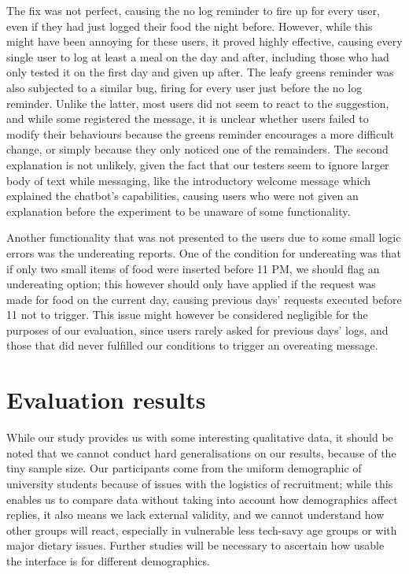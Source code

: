 The fix was not perfect, causing the no log reminder to fire up for every user, even if they had just logged their food the night before. However, while this might have been annoying for these users, it proved highly effective, causing every single user to log at least a meal on the day and after, including those who had only tested it on the first day and given up after. The leafy greens reminder was also subjected to a similar bug, firing for every user just before the no log reminder. Unlike the latter, most users did not seem to react to the suggestion, and while some registered the message, it is unclear whether users failed to modify their behaviours because the greens reminder encourages a more difficult change, or simply because they only noticed one of the remainders. The second explanation is not unlikely, given the fact that our testers seem to ignore larger body of text while messaging, like the introductory welcome message which explained the chatbot's capabilities, causing users who were not given an explanation before the experiment to be unaware of some functionality. 

Another functionality that was not presented to the users due to some small logic errors was the undereating reports. One of the condition for undereating was that if only two small items of food were inserted before 11 PM, we should flag an undereating option; this however should only have applied if the request was made for food on the current day, causing previous days' requests executed before 11 not to trigger. This issue might however be considered negligible for the purposes of our evaluation, since users rarely asked for previous days' logs, and those that did never fulfilled our conditions to trigger an overeating message.
\section{Evaluation results}
While our study provides us with some interesting qualitative data, it should be noted that we cannot conduct hard generalisations on our results, because of the tiny sample size. Our participants come from the uniform demographic of university students because of issues with the logistics of recruitment; while this enables us to compare data without taking into account how demographics affect replies, it also means we lack external validity, and we cannot understand how other groups will react, especially in vulnerable less tech-savy age groups or with major dietary issues. Further studies will be necessary to ascertain how usable the interface is for different demographics. 

